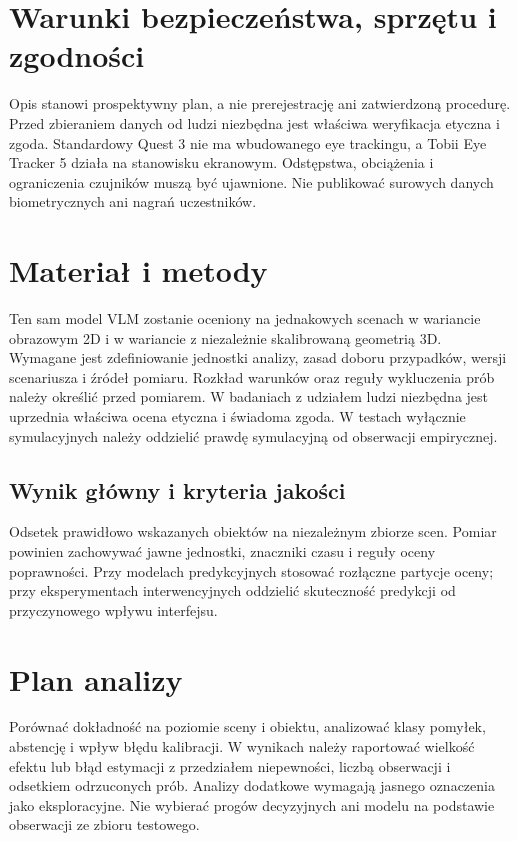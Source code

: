 \documentclass[11pt,a4paper]{article}
\begin{document}
\section{Warunki bezpieczeństwa, sprzętu i zgodności}
Opis stanowi prospektywny plan, a nie prerejestrację ani zatwierdzoną procedurę. Przed zbieraniem danych od ludzi niezbędna jest właściwa weryfikacja etyczna i zgoda. Standardowy Quest 3 nie ma wbudowanego eye trackingu, a Tobii Eye Tracker 5 działa na stanowisku ekranowym. Odstępstwa, obciążenia i ograniczenia czujników muszą być ujawnione. Nie publikować surowych danych biometrycznych ani nagrań uczestników.

\section{Materiał i metody}

Ten sam model VLM zostanie oceniony na jednakowych scenach w wariancie obrazowym 2D i w wariancie z niezależnie skalibrowaną geometrią 3D. Wymagane jest zdefiniowanie jednostki analizy, zasad doboru przypadków, wersji scenariusza i źródeł pomiaru. Rozkład warunków oraz reguły wykluczenia prób należy określić przed pomiarem. W badaniach z udziałem ludzi niezbędna jest uprzednia właściwa ocena etyczna i świadoma zgoda. W testach wyłącznie symulacyjnych należy oddzielić prawdę symulacyjną od obserwacji empirycznej.

\subsection{Wynik główny i kryteria jakości}

Odsetek prawidłowo wskazanych obiektów na niezależnym zbiorze scen. Pomiar powinien zachowywać jawne jednostki, znaczniki czasu i reguły oceny poprawności. Przy modelach predykcyjnych stosować rozłączne partycje oceny; przy eksperymentach interwencyjnych oddzielić skuteczność predykcji od przyczynowego wpływu interfejsu.

\section{Plan analizy}

Porównać dokładność na poziomie sceny i obiektu, analizować klasy pomyłek, abstencję i wpływ błędu kalibracji. W wynikach należy raportować wielkość efektu lub błąd estymacji z przedziałem niepewności, liczbą obserwacji i odsetkiem odrzuconych prób. Analizy dodatkowe wymagają jasnego oznaczenia jako eksploracyjne. Nie wybierać progów decyzyjnych ani modelu na podstawie obserwacji ze zbioru testowego.
\end{document}
